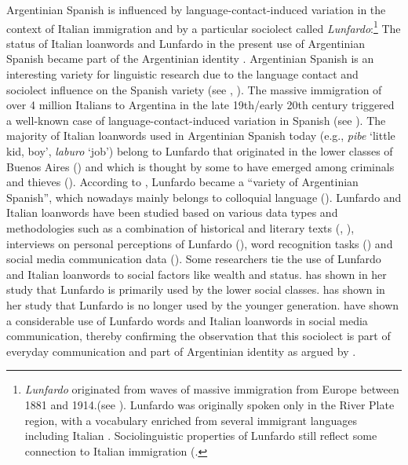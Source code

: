 {Argentinian Spanish is influenced by language-contact-induced variation in the context of Italian immigration and by a particular sociolect called \textit{Lunfardo}:\footnote{\textit{Lunfardo}
  {originated from waves of massive immigration from Europe between 1881 and 1914.(see \citealt{Devoto2002}).} {{Lunfardo}} {was originally spoken only in the River Plate region, with a vocabulary enriched from several immigrant languages including Italian \citep{Conde2011}. Sociolinguistic properties of Lunfardo still reflect some connection to Italian immigration (\citet{Kellert-francia-2023}}.}
The status of Italian loanwords and Lunfardo in the present use of Argentinian Spanish became part of the Argentinian identity \citep{Kailuweit2016}. Argentinian Spanish is an interesting variety for linguistic research due to the language contact and sociolect influence on the Spanish variety (see \cite{Conde2011, conde2011lunfardo, engels2011italo, kailuweit2016spirale, wurth2019otro, kellert2023linguistic}, \citealt{Kellert-francia-2023}). The massive immigration of over 4 million Italians to Argentina in the late 19th/early 20th century triggered a well-known case of language-contact-induced variation in Spanish (see \cite{engels2011italo}). The majority of Italian loanwords used in Argentinian Spanish today (e.g., \textit{pibe} ‘little kid, boy’, \textit{laburo} ‘job’) belong to Lunfardo that originated in the lower classes of Buenos Aires (\cite{engels2011italo, wurth2019otro}) and which is thought by some to have emerged among criminals and thieves (\cite{moosekian2016lunfardo}). According to \citet{conde2011lunfardo}, Lunfardo became a “variety of Argentinian Spanish”, which nowadays mainly belongs to colloquial language (\citealt{teruggi1974panorama,FontanelladeWeinberg2000,Wunderlich2012}). Lunfardo and Italian loanwords have been studied based on various data types and methodologies such as a combination of historical and literary texts (\cite{engels2011italo}, \cite{kailuweit2016spirale}), interviews on personal perceptions of Lunfardo (\citealt{wurth2019otro}), word recognition tasks (\cite{moosekian2016lunfardo}) and social media communication data (\citealt{kellert2023linguistic, Kellert-francia-2023}). Some researchers tie the use of Lunfardo and Italian loanwords to social factors like wealth and status. \citet{wurth2019otro} has shown in her study that Lunfardo is primarily used by the lower social classes. \citet{moosekian2016lunfardo} has shown in her study that Lunfardo is no longer used by the younger generation. \citet{kellert2023linguistic, Kellert-francia-2023} have shown a considerable use of Lunfardo words and Italian loanwords in social media communication, thereby confirming the observation that this sociolect is part of everyday communication and part of Argentinian identity as argued by \citet{kailuweit2016spirale}.}

